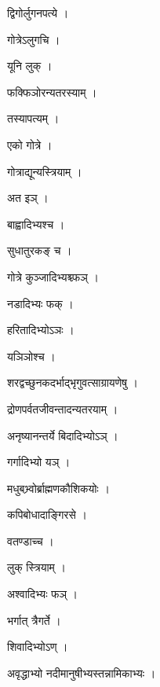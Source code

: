 \documentclass[10pt, openany]{book}
\begin{document}
\noindent द्विगोर्लुगनपत्ये ।

\noindent गोत्रेऽलुगचि ।

\noindent यूनि लुक् ।

\noindent फक्फिञोरन्यतरस्याम् ।

\noindent तस्यापत्यम् ।

\noindent एको गोत्रे ।

\noindent गोत्राद्यून्यस्त्रियाम् ।

\noindent अत इञ् ।

\noindent बाह्वादिभ्यश्च ।

\noindent सुधातुरकङ् च ।

\noindent गोत्रे कुञ्जादिभ्यश्च्फञ् ।

\noindent नडादिभ्यः फक् ।

\noindent हरितादिभ्योऽञः ।

\noindent यञिञोश्च ।

\noindent शरद्वच्छुनकदर्भाद्भृगुवत्साग्रायणेषु ।

\noindent द्रोणपर्वतजीवन्तादन्यतरयाम् ।

\noindent अनृष्यानन्तर्ये बिदादिभ्योऽञ् ।

\noindent गर्गादिभ्यो यञ् ।

\noindent मधुबभ्र्वोर्ब्राह्मणकौशिकयोः ।

\noindent कपिबोधादाङ्गिरसे ।

\noindent वतण्डाच्च ।

\noindent लुक् स्त्रियाम् ।

\noindent अश्वादिभ्यः फञ् ।

\noindent भर्गात् त्रैगर्ते ।

\noindent शिवादिभ्योऽण् ।

\noindent अवृद्धाभ्यो नदीमानुषीभ्यस्तन्नामिकाभ्यः ।
\end{document}
